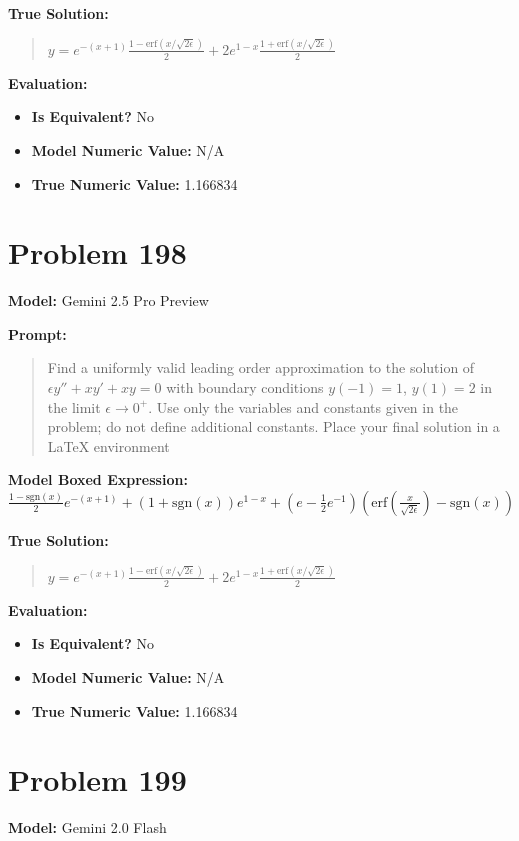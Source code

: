 \documentclass{article}
\begin{document}
{\textbf{True Solution:}
\begin{quote}
$y = e^{-(x+1)} \frac{1-\text{erf}(x/\sqrt{2\epsilon})}{2} + 2e^{1-x} \frac{1+\text{erf}(x/\sqrt{2\epsilon})}{2}$
\end{quote}

\textbf{Evaluation:}
\begin{itemize}
\item \textbf{Is Equivalent?} No
\item \textbf{Model Numeric Value:} N/A
\item \textbf{True Numeric Value:} 1.166834
\end{itemize}
\vspace{1cm}
\section*{Problem 198}
\textbf{Model:} Gemini 2.5 Pro Preview

\textbf{Prompt:}
\begin{quote}
Find a uniformly valid leading order approximation to the solution of $\epsilon y'' + x y' + x y = 0$ with boundary conditions $y(-1) = 1$, $y(1) = 2$ in the limit $\epsilon \to 0^+$. Use only the variables and constants given in the problem; do not define additional constants. Place your final solution in a $\boxed{}$ LaTeX environment
\end{quote}
\textbf{Model Boxed Expression:} $\frac{1-\text{sgn}(x)}{2} e^{-(x+1)} + (1+\text{sgn}(x)) e^{1-x} + \left(e - \frac{1}{2}e^{-1}\right) \left(\text{erf}\left(\frac{x}{\sqrt{2\epsilon}}\right) - \text{sgn}(x)\right)$

\textbf{True Solution:}
\begin{quote}
$y = e^{-(x+1)} \frac{1-\text{erf}(x/\sqrt{2\epsilon})}{2} + 2e^{1-x} \frac{1+\text{erf}(x/\sqrt{2\epsilon})}{2}$
\end{quote}

\textbf{Evaluation:}
\begin{itemize}
\item \textbf{Is Equivalent?} No
\item \textbf{Model Numeric Value:} N/A
\item \textbf{True Numeric Value:} 1.166834
\end{itemize}
\vspace{1cm}
\section*{Problem 199}
\textbf{Model:} Gemini 2.0 Flash

}
\end{document}
